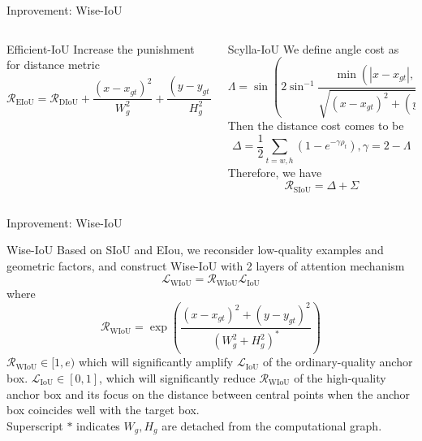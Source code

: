 \begin{frame}{Inprovement: Wise-IoU}
	\begin{columns}
		\begin{column}{0.45\textwidth}
			\begin{block}{Efficient-IoU}
				Increase the punishment for distance metric
				\begin{equation}
					\mathcal{R}_\text{EIoU}=\mathcal{R}_\text{DIoU}+\frac{\left(x-x_{g t}\right)^2}{W_g^2}+\frac{\left(y-y_{g t}\right)^2}{H_g^2}
				\end{equation}
			\end{block}
		\end{column}
		\pause
		\begin{column}{0.55\textwidth}
			\begin{block}{Scylla-IoU}
				We define angle cost as
				\begin{equation}
					\Lambda=\sin \left(2 \sin ^{-1} \frac{\min \left(\left|x-x_{g t}\right|,\left|y-y_{g t}\right|\right)}{\sqrt{\left(x-x_{g t}\right)^2+\left(y-y_{g t}\right)^2}+\varepsilon}\right)
				\end{equation}
				Then the distance cost comes to be
				\begin{equation}
					\Delta=\frac{1}{2} \sum_{t=w, h}\left(1-e^{-\gamma \rho_t}\right), \gamma=2-\Lambda
				\end{equation}
				Therefore, we have
				\begin{equation}
					\mathcal{R}_\text{SIoU}=\Delta+\Sigma
				\end{equation}
			\end{block}
		\end{column}
	\end{columns}
\end{frame}

\begin{frame}{Inprovement: Wise-IoU}
	\begin{block}{Wise-IoU}
		Based on SIoU and EIou, we reconsider low-quality examples and geometric factors, and construct Wise-IoU with 2 layers of attention mechanism
		\begin{equation}
			\mathcal{L}_\text{WIoU}=\mathcal{R}_\text{WIoU}\mathcal{L}_\text{IoU}
		\end{equation}
		where
		\begin{equation}
			\mathcal{R}_\text{WIoU}=\exp\left(\frac{(x-x_{gt})^2+(y-y_{gt})^2}{(W^2_g+H^2_g)^*}\right)
		\end{equation}
		$\mathcal{R}_\text{WIoU}\in [1,e)$ which will significantly amplify $\mathcal{L}_\text{IoU}$ of the ordinary-quality anchor box. $\mathcal{L}_\text{IoU}\in [0,1]$, which will significantly reduce $\mathcal{R}_\text{WIoU}$ of the high-quality anchor box and its focus on the distance between central points when the anchor box coincides well with the target box.\\
		Superscript $*$ indicates $W_g,H_g$ are detached from the computational graph.
	\end{block}
\end{frame}


